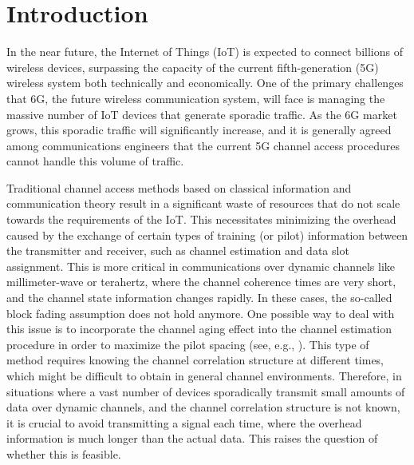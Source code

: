 \documentclass[conference,10pt]{IEEEtran}
\theoremstyle{remark}
\theoremstyle{plain}
\theoremstyle{definition}
\theoremstyle{remark}
\begin{document}
\section{Introduction}
In the near future, the Internet of Things (IoT) is expected to connect billions of wireless devices, surpassing the capacity of the current fifth-generation (5G) wireless system both technically and economically. One of the primary challenges that 6G, the future wireless communication system, will face is managing the massive number of IoT devices that generate sporadic traffic. As the 6G market grows, this sporadic traffic will significantly increase, and it is generally agreed among communications engineers that the current 5G channel access procedures cannot handle this volume of traffic.

Traditional channel access methods based on classical information and communication theory result in a significant waste of resources that do not scale towards the requirements of the IoT. This necessitates minimizing the overhead caused by the exchange of certain types of training (or pilot) information between the transmitter and receiver, such as channel estimation and data slot assignment. This is more critical in communications over dynamic channels like millimeter-wave or terahertz, where the channel coherence times are very short, and the channel state information changes rapidly. In these cases, the so-called block fading assumption does not hold anymore. One possible way to deal with this issue is to incorporate the channel aging effect into the channel estimation procedure in order to maximize the pilot spacing (see, e.g., \cite{fodor2023optimizing}). This type of method requires knowing the channel correlation structure at different times, which might be difficult to obtain in general channel environments. 
Therefore, in situations where a vast number of devices sporadically transmit small amounts of data over dynamic channels, and the channel correlation structure is not known, it is crucial to avoid transmitting a signal each time, where the overhead information is much longer than the actual data. This raises the question of whether this is feasible.
\end{document}
